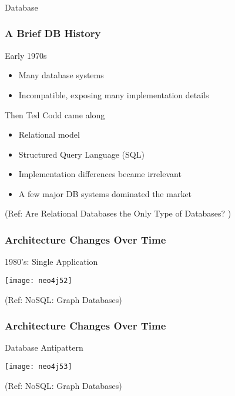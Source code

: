 \begin{frame}[fragile]\frametitle{}
\begin{center}
{\Large Database}
\end{center}
\end{frame}

\begin{frame}\frametitle{A Brief DB History}

Early 1970s

\begin{itemize}
\item Many database systems
\item Incompatible, exposing many implementation details
\end{itemize}

Then Ted Codd came along
\begin{itemize}
\item Relational model
\item Structured Query Language (SQL)
\item Implementation differences became irrelevant
\item A few major DB systems dominated the market
\end{itemize}


{\tiny (Ref: Are Relational Databases the Only Type of Databases? )}
\end{frame}


\begin{frame}\frametitle{Architecture Changes Over Time }
1980’s: Single Application


\begin{center}
\texttt{[image: neo4j52]}
\end{center}	

{\tiny (Ref: NoSQL: Graph Databases)}

\end{frame}

\begin{frame}\frametitle{Architecture Changes Over Time }
Database Antipattern


\begin{center}
\texttt{[image: neo4j53]}
\end{center}	

{\tiny (Ref: NoSQL: Graph Databases)}

\end{frame}


